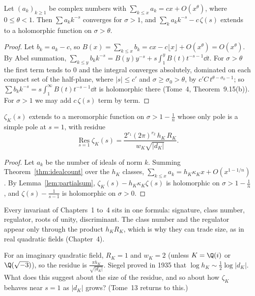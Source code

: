 \begin{lemma}\label{lem:partialsum}
Let $(a_k)_{k\ge1}$ be complex numbers with $\sum_{k\le x}a_k=cx+O(x^\theta)$, where $0\le\theta<1$. Then $\sum a_kk^{-s}$ converges for
$\sigma>1$, and $\sum_ka_kk^{-s}-c\,\zeta(s)$ extends to a holomorphic function on $\sigma>\theta$.
\end{lemma}
\begin{proof}
Let $b_k=a_k-c$, so $B(x)=\sum_{k\le x}b_k=cx-c\lfloor x\rfloor+O(x^\theta)=O(x^\theta)$. By Abel summation, $\sum_{k\le y}b_kk^{-s}=
B(y)y^{-s}+s\int_1^yB(t)t^{-s-1}\dd t$. For $\sigma>\theta$ the first term tends to $0$ and the integral converges absolutely,
dominated on each compact set of the half-plane, where $|s|\le c'$ and $\sigma\ge\sigma_0>\theta$, by $c'C\,t^{\theta-\sigma_0-1}$; so $\sum b_kk^{-s}=s\int_1^\infty B(t)t^{-s-1}\dd t$ is
holomorphic there (Tome~4, Theorem~9.15(b)). For $\sigma>1$ we may add $c\,\zeta(s)$ term by term.
\end{proof}

\begin{theorem}\label{thm:cnf}
$\zeta_K(s)$ extends to a meromorphic function on $\sigma>1-\frac1n$ whose only pole is a simple pole at $s=1$, with residue
\[
\operatorname*{Res}_{s=1}\zeta_K(s)=\frac{2^{r_1}(2\pi)^{r_2}\,h_K\,R_K}{w_K\sqrt{|d_K|}}.
\]
\end{theorem}
\begin{proof}
Let $a_k$ be the number of ideals of norm $k$. Summing Theorem~\ref{thm:idealcount} over the $h_K$ classes, $\sum_{k\le x}a_k=h_K\kappa_Kx+
O(x^{1-1/n})$. By Lemma~\ref{lem:partialsum}, $\zeta_K(s)-h_K\kappa_K\zeta(s)$ is holomorphic on $\sigma>1-\frac1n$, and $\zeta(s)-\frac1{s-1}$
is holomorphic on $\sigma>0$.
\end{proof}

Every invariant of Chapters~1 to~4 sits in one formula: signature, class number, regulator, roots of unity, discriminant. The class number
and the regulator appear only through the product $h_KR_K$, which is why they can trade size, as in real quadratic fields
(Chapter~4).

\begin{think}
For an imaginary quadratic field, $R_K=1$ and $w_K=2$ (unless $K=\Q(i)$ or $\Q(\sqrt{-3})$), so the residue is $\frac{\pi h_K}{\sqrt{|d_K|}}$.
Siegel proved in 1935 that $\log h_K\sim\frac12\log|d_K|$. What does this suggest about the size of the residue, and so about how
$\zeta_K$ behaves near $s=1$ as $|d_K|$ grows? (Tome~13 returns to this.)
\end{think}

